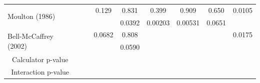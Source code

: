 \begin{tabular}{ccccccccc}
\midrule
\multicolumn{1}{l}{\multirow{2}[2]{*}{Moulton (1986)}} &       &       & 0.129 & 0.831 & 0.399 & 0.909 & 0.650 & 0.0105 \\
      & \cellcolor[rgb]{ .851,  .851,  .851} & \cellcolor[rgb]{ .851,  .851,  .851} & \cellcolor[rgb]{ .851,  .851,  .851} & \cellcolor[rgb]{ .851,  .851,  .851}0.0392 & \cellcolor[rgb]{ .851,  .851,  .851}0.00203 & \cellcolor[rgb]{ .851,  .851,  .851}0.00531 & \cellcolor[rgb]{ .851,  .851,  .851}0.0651 & \cellcolor[rgb]{ .851,  .851,  .851} \\
\midrule
\multicolumn{1}{l}{\multirow{2}[2]{*}{Bell-McCaffrey (2002)}} &       &       & 0.0682 & 0.808 &       &       &       & 0.0175 \\
      & \cellcolor[rgb]{ .851,  .851,  .851} & \cellcolor[rgb]{ .851,  .851,  .851} & \cellcolor[rgb]{ .851,  .851,  .851} & \cellcolor[rgb]{ .851,  .851,  .851}0.0590 & \cellcolor[rgb]{ .851,  .851,  .851} & \cellcolor[rgb]{ .851,  .851,  .851} & \cellcolor[rgb]{ .851,  .851,  .851} & \cellcolor[rgb]{ .851,  .851,  .851} \\
\midrule
\midrule
Calculator p-value &       &       &       &       &       &       &       &  \\
\rowcolor[rgb]{ .851,  .851,  .851} Interaction p-value & \cellcolor[rgb]{ 1,  1,  1} & \cellcolor[rgb]{ 1,  1,  1} & \cellcolor[rgb]{ 1,  1,  1} & \cellcolor[rgb]{ 1,  1,  1} & \cellcolor[rgb]{ 1,  1,  1} & \cellcolor[rgb]{ 1,  1,  1} & \cellcolor[rgb]{ 1,  1,  1} & \cellcolor[rgb]{ 1,  1,  1} \\
\end{tabular}%
